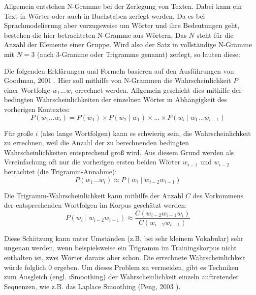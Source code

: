 Allgemein entstehen N-Gramme bei der Zerlegung von Texten. Dabei kann ein Text in Wörter oder auch in Buchstaben zerlegt werden. Da es bei Sprachmodelierung aber vorzugsweise um Wörter und ihre Bedeutungen geht, bestehen die hier betrachteten N-Gramme aus Wörtern. Das $N$ steht für die Anzahl der Elemente einer Gruppe. Wird also der Satz  in vollständige N-Gramme mit $N = 3$ (auch 3-Gramme oder Trigramme genannt) zerlegt, so lauten diese:


Die folgenden Erklärungen und Formeln basieren auf den Ausführungen von Goodman, 2001 \cite{Goodman2001}. Hier soll mithilfe von N-Grammen die Wahrscheinlichkeit $P$ einer Wortfolge $w_1 ... w_i$ errechnet werden. Allgemein geschieht dies mithilfe der bedingten Wahrscheinlichkeiten der einzelnen Wörter in Abhängigkeit des vorherigen Kontextes:\\
\begin{equation}
    P(w_1 ... w_i) = P(w_1) \times P(w_2\mid w_1) \times ... \times P(w_i\mid w_1 ... w_{i-1}) \label{eq.ngram_common}
\end{equation}

Für große $i$ (also lange Wortfolgen) kann es schwierig sein, die Wahrscheinlichkeit zu errechnen, weil die Anzahl der zu berechnenden bedingten Wahrscheinlichkeiten entsprechend groß wird. Aus diesem Grund werden als Vereinfachung oft nur die vorherigen ersten beiden Wörter $w_{i-1}$ und $w_{i-2}$ betrachtet (die Trigramm-Annahme):\\
\begin{equation}
    P(w_1 ... w_i) \approx P(w_i\mid w_{i-2} w_{i-1}) \label{eq.ngram_trigram}
\end{equation}

Die Trigramm-Wahrscheinlichkeit kann mithilfe der Anzahl $C$ des Vorkommens der entsprechenden Wortfolgen im Korpus geschätzt werden:\\
\begin{equation}
    P(w_i\mid w_{i-2} w_{i-1}) \approx \frac{C(w_{i-2} w_{i-1} w_i)}{C(w_{i-2} w_{i-1})}  \label{eq.ngram_trigram_counts}
\end{equation}

Diese Schätzung kann unter Umständen (z.B. bei sehr kleinem Vokabular) sehr ungenau werden, wenn beispielsweise ein Trigramm im Trainingskorpus nicht enthalten ist, zwei Wörter daraus aber schon. Die errechnete Wahrscheinlichkeit würde folglich $0$ ergeben. Um dieses Problem zu vermeiden, gibt es Techniken zum Ausgleich (engl. \i{Smoothing}) der Wahrscheinlichkeit einzeln auftretender Sequenzen, wie z.B. das Laplace Smoothing (Peng, 2003 \citep{Peng2003}).

